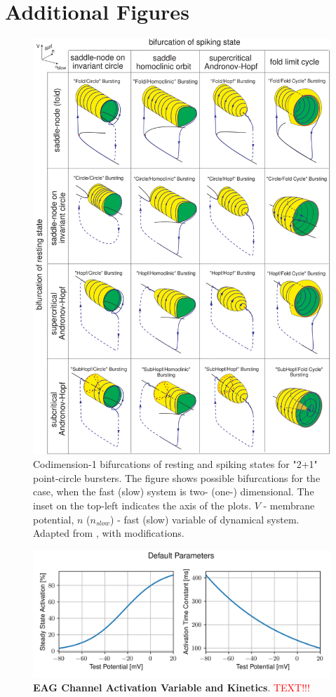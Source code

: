 \documentclass[../main.tex]{subfiles}
\begin{document}
\section{Additional Figures}

\begin{figure}[!b]
    \centering
    \includegraphics[width=0.75\linewidth]{../img/modeling_r5/examples/point_circle_bursters.png}
    \caption[Codimension-1 bifurcations of resting and spiking states for "2+1" point-circle bursters.]{
        Codimension-1 bifurcations of resting and spiking states for "2+1" point-circle bursters.
        The figure shows possible bifurcations for the case, when the fast (slow) system is
        two- (one-) dimensional. The inset on the top-left indicates the axis of the plots.
        $V$ - membrane potential, $n$ ($n_{slow}$) - fast (slow) variable of dynamical system.
        Adapted from \parencite{izhikevichDynamicalSystemsNeuroscience2006}, with modifications.
    }
    \label{fig:izhikevich_point_circle_bursters}
\end{figure}

\begin{figure}[!t]
    \centering
    \includegraphics[width=0.85\linewidth]{../img/spiking_to_bursting/eag_default.png}
    \caption[EAG Channel Activation Variable and Kinetics]{
        \textbf{EAG Channel Activation Variable and Kinetics}. \textcolor{red}{TEXT!!!}
    }
    \label{fig:spiking_to_bursting_eag_params_default}
\end{figure}
\end{document}
